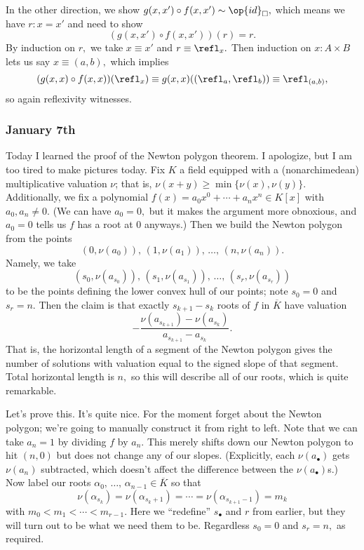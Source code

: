 In the other direction, we show $g(x,x')\circ f(x,x')\sim\op{id}_\square,$ which means we have $r:x=x'$ and need to show
\[(g(x,x')\circ f(x,x'))(r)=r.\]
By induction on $r,$ we take $x\equiv x'$ and $r\equiv\refl_x.$ Then induction on $x:A\times B$ lets us say $x\equiv(a,b),$ which implies
\[(g(x,x)\circ f(x,x))(\refl_x)\equiv g(x,x)((\refl_a,\refl_b))\equiv\refl_{(a,b)},\]
so again reflexivity witnesses.

\subsubsection{January 7th}
Today I learned the proof of the Newton polygon theorem. I apologize, but I am too tired to make pictures today. Fix $K$ a field equipped with a (nonarchimedean) multiplicative valuation $\nu$; that is, $\nu(x+y)\ge\min\{\nu(x),\nu(y)\}.$ Additionally, we fix a polynomial $f(x)=a_0x^0+\cdots+a_nx^n\in K[x]$ with $a_0,a_n\ne0.$ (We can have $a_0=0,$ but it makes the argument more obnoxious, and $a_0=0$ tells us $f$ has a root at $0$ anyways.) Then we build the Newton polygon from the points
\[(0,\nu(a_0)),\,(1,\nu(a_1)),\,\ldots,\,(n,\nu(a_n)).\]
Namely, we take
\[(s_0,\nu(a_{s_0})),\,(s_1,\nu(a_{s_1})),\,\ldots,\,(s_r,\nu(a_{s_r}))\]
to be the points defining the lower convex hull of our points; note $s_0=0$ and $s_r=n.$ Then the claim is that exactly $s_{k+1}-s_k$ roots of $f$ in $\overline K$ have valuation
\[-\frac{\nu(a_{s_{k+1}})-\nu(a_{s_k})}{a_{s_{k+1}}-a_{s_k}}.\]
That is, the horizontal length of a segment of the Newton polygon gives the number of solutions with valuation equal to the signed slope of that segment. Total horizontal length is $n,$ so this will describe all of our roots, which is quite remarkable.

Let's prove this. It's quite nice. For the moment forget about the Newton polygon; we're going to manually construct it from right to left. Note that we can take $a_n=1$ by dividing $f$ by $a_n.$ This merely shifts down our Newton polygon to hit $(n,0)$ but does not change any of our slopes. (Explicitly, each $\nu(a_\bullet)$ gets $\nu(a_n)$ subtracted, which doesn't affect the difference between the $\nu(a_\bullet)$s.) Now label our roots $\alpha_0,\,\ldots,\,\alpha_{n-1}\in\overline K$ so that
\[\nu(\alpha_{s_k})=\nu(\alpha_{s_k+1})=\cdots=\nu(\alpha_{s_{k+1}-1})=m_k\]
with $m_0<m_1<\cdots<m_{r-1}.$ Here we ``redefine'' $s_\bullet$ and $r$ from earlier, but they will turn out to be what we need them to be. Regardless $s_0=0$ and $s_r=n,$ as required.

